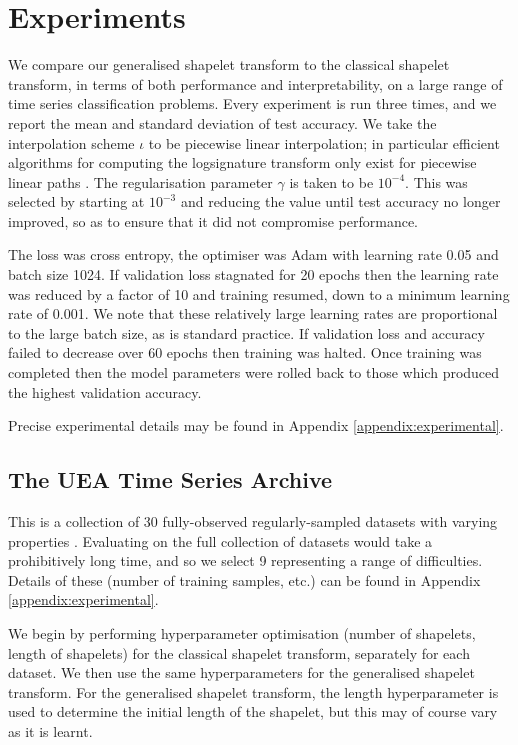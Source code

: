 \documentclass{article}
\theoremstyle{plain}
\theoremstyle{definition}
\begin{document}
	
\section{Experiments}\label{section:experiments}
We compare our generalised shapelet transform to the classical shapelet transform, in terms of both performance and interpretability, on a large range of time series classification problems. Every experiment is run three times, and we report the mean and standard deviation of test accuracy. We take the interpolation scheme $\iota$ to be piecewise linear interpolation; in particular efficient algorithms for computing the logsignature transform only exist for piecewise linear paths \cite{signatory}. The regularisation parameter $\gamma$ is taken to be $10^{-4}$. This was selected by starting at $10^{-3}$ and reducing the value until test accuracy no longer improved, so as to ensure that it did not compromise performance.

The loss was cross entropy, the optimiser was Adam \cite{kingma2015} with learning rate 0.05 and batch size 1024. If validation loss stagnated for 20 epochs then the learning rate was reduced by a factor of 10 and training resumed, down to a minimum learning rate of 0.001. We note that these relatively large learning rates are proportional to the large batch size, as is standard practice. If validation loss and accuracy failed to decrease over 60 epochs then training was halted. Once training was completed then the model parameters were rolled back to those which produced the highest validation accuracy.

Precise experimental details may be found in Appendix \ref{appendix:experimental}.

\subsection{The UEA Time Series Archive} \label{subsec:uea_classification}
This is a collection of 30 fully-observed regularly-sampled datasets with varying properties \cite{bagnall2018uea}. Evaluating on the full collection of datasets would take a prohibitively long time, and so we select 9 representing a range of difficulties. Details of these (number of training samples, etc.) can be found in Appendix \ref{appendix:experimental}.

We begin by performing hyperparameter optimisation (number of shapelets, length of shapelets) for the classical shapelet transform, separately for each dataset. We then use the same hyperparameters for the generalised shapelet transform. For the generalised shapelet transform, the length hyperparameter is used to determine the initial length of the shapelet, but this may of course vary as it is learnt.
\end{document}
